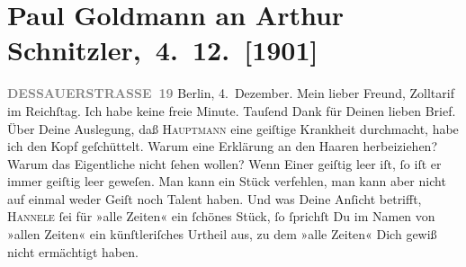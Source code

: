                \section[ Paul Goldmann an Arthur Schnitzler, 4. 12. {[}1901{]}]{ Paul Goldmann an Arthur Schnitzler, 4. 12. {[}1901{]}}\nopagebreak{}\rehead{ }\begin{ledgroupsized}[t]{13cm}\normalsize\beginnumbering \toendnotes[C]{\smallbreak\pagebreak[2]} 
\toendnotes[C]{\smallbreak}\pstart
           \noindent{}\raggedleft{}{\pb}\textcolor{gray}{\textbf{DESSAUERSTRASSE 19}}\pend
           \pstart
           Berlin, 4. Dezember.\pend
           \pstart\center{}Mein lieber Freund,\pend\pstart
           Zolltarif im Reichſtag. Ich habe keine freie
               Minute.\pend
           \pstart
           Tauſend Dank für Deinen lieben Brief.\pend
           \pstart
           Über Deine Auslegung, daß \textsc{Hauptmann} eine geiſtige Krankheit durchmacht, habe ich den Kopf geſchüttelt. Warum eine
               Erklärung {\pb}an den Haaren herbeiziehen? Warum das
               Eigentliche nicht ſehen wollen? Wenn Einer geiſtig leer iſt, ſo iſt er immer geiſtig
               leer geweſen. Man kann ein Stück verfehlen, man kann aber nicht auf einmal weder
               Geiſt noch Talent haben. Und was Deine Anſicht betrifft, \textsc{Hannele} ſei für »alle Zeiten« ein ſchönes Stück, ſo ſprichſt Du im Namen von »allen
               Zeiten« ein künſtleriſches Urtheil aus, zu dem »alle Zeiten« Dich gewiß {\pb}nicht ermächtigt haben.\pend
           \pstart

\end{ledgroupsized}
